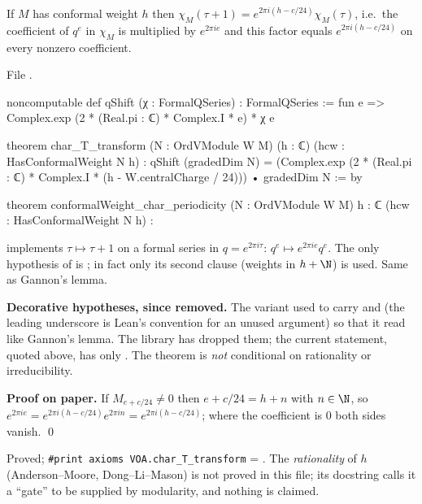 \begin{theorem}\label{l12:thm:Tperiod}
If $M$ has conformal weight $h$ then $\chi_M(\tau+1) = e^{2\pi i(h-c/24)}\chi_M(\tau)$, i.e.\ the coefficient
of $q^e$ in $\chi_M$ is multiplied by $e^{2\pi ie}$ and this factor equals $e^{2\pi i(h-c/24)}$ on every
nonzero coefficient.
\end{theorem}
\noindent File .
\begin{leancode}
noncomputable def qShift (χ : FormalQSeries) : FormalQSeries :=
  fun e => Complex.exp (2 * (Real.pi : ℂ) * Complex.I * e) * χ e

theorem char_T_transform (N : OrdVModule W M) (h : ℂ) (hcw : HasConformalWeight N h) :
    qShift (gradedDim N)
      = (Complex.exp (2 * (Real.pi : ℂ) * Complex.I * (h - W.centralCharge / 24)))
          • gradedDim N := by

theorem conformalWeight_char_periodicity (N : OrdVModule W M)
    {h : ℂ} (hcw : HasConformalWeight N h) :
\end{leancode}

\begin{dictionary}
 implements $\tau\mapsto\tau+1$ on a formal series in $q = e^{2\pi i\tau}$: $q^e\mapsto e^{2\pi ie}q^e$.
The only hypothesis of  is ; in fact only its second clause
(weights in $h+\N$) is used. Same as Gannon's lemma.

\textbf{Decorative hypotheses, since removed.} The variant
\allowbreak{}\allowbreak{} used to carry  and
 (the leading underscore is Lean's convention for an unused argument) so
that it read like Gannon's lemma. The library has dropped them; the current statement, quoted above, has only
. The theorem is \emph{not} conditional on rationality or irreducibility.
\end{dictionary}

\textbf{Proof on paper.} If $M_{e+c/24}\neq0$ then $e+c/24 = h+n$ with $n\in\N$, so
$e^{2\pi ie} = e^{2\pi i(h-c/24)}e^{2\pi in} = e^{2\pi i(h-c/24)}$; where the coefficient is $0$ both sides vanish.
\qed

\begin{status}
Proved; \texttt{\#print axioms VOA.char\_T\_transform} = .
The \emph{rationality} of $h$ (Anderson--Moore, Dong--Li--Mason) is not proved in this file; its docstring calls
it a ``gate'' to be supplied by modularity, and nothing is claimed.
\end{status}

